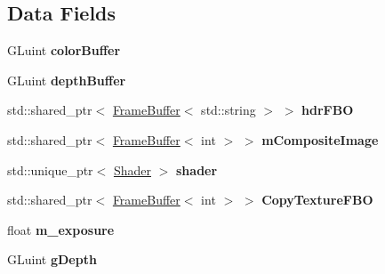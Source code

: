 \subsection*{Data Fields}
\begin{DoxyCompactItemize}
\item 
G\+Luint {\bfseries color\+Buffer}\hypertarget{class_post_process_af6ac3992f1a6a8728aa53e035497a4b9}{}\label{class_post_process_af6ac3992f1a6a8728aa53e035497a4b9}

\item 
G\+Luint {\bfseries depth\+Buffer}\hypertarget{class_post_process_ae17db17c81e11a32fc20bc2b2421ca32}{}\label{class_post_process_ae17db17c81e11a32fc20bc2b2421ca32}

\item 
std\+::shared\+\_\+ptr$<$ \hyperlink{class_frame_buffer}{Frame\+Buffer}$<$ std\+::string $>$ $>$ {\bfseries hdr\+F\+BO}\hypertarget{class_post_process_aa3cc5d7e8298e283a829f2c4c0940fcb}{}\label{class_post_process_aa3cc5d7e8298e283a829f2c4c0940fcb}

\item 
std\+::shared\+\_\+ptr$<$ \hyperlink{class_frame_buffer}{Frame\+Buffer}$<$ int $>$ $>$ {\bfseries m\+Composite\+Image}\hypertarget{class_post_process_a7ed4bcff383006fb9382f8dbcb506be7}{}\label{class_post_process_a7ed4bcff383006fb9382f8dbcb506be7}

\item 
std\+::unique\+\_\+ptr$<$ \hyperlink{class_shader}{Shader} $>$ {\bfseries shader}\hypertarget{class_post_process_a02ff6a0163605ec1b9305a62f0d1efaa}{}\label{class_post_process_a02ff6a0163605ec1b9305a62f0d1efaa}

\item 
std\+::shared\+\_\+ptr$<$ \hyperlink{class_frame_buffer}{Frame\+Buffer}$<$ int $>$ $>$ {\bfseries Copy\+Texture\+F\+BO}\hypertarget{class_post_process_a4e567b3efb33e26fbfc712ee78f4cae9}{}\label{class_post_process_a4e567b3efb33e26fbfc712ee78f4cae9}

\item 
float {\bfseries m\+\_\+exposure}\hypertarget{class_post_process_ae6b3e05d49ce3db14e54fc69cecfae37}{}\label{class_post_process_ae6b3e05d49ce3db14e54fc69cecfae37}

\item 
G\+Luint {\bfseries g\+Depth}\hypertarget{class_post_process_a94f0a0ba6c405c3b4ad6ca8c8ac0b2cf}{}\label{class_post_process_a94f0a0ba6c405c3b4ad6ca8c8ac0b2cf}

\end{DoxyCompactItemize}
